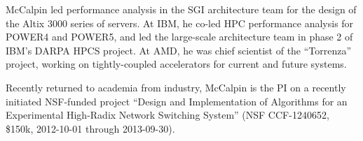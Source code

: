 McCalpin led performance analysis in the SGI architecture team for the design 
of the Altix 3000 series of servers.  At IBM, he co-led HPC performance analysis
for POWER4 and POWER5, and led the large-scale architecture team in phase 2
of IBM's DARPA HPCS project.  At AMD, he was chief scientist of the ``Torrenza''
project, working on tightly-coupled accelerators for current and future systems.


\begin{comment}
At SGI, McCalpin was the performance lead on the architecture of the SGI
Altix3000 series of scalable distributed shared memory servers.
At IBM, he co-led HPC performance analysis for the POWER4 systems, 
made major contributions to the POWER5 design, led POWER5 post-silicon
performance analysis, and led the large-scale architecture team in
phase 2 of IBM's DARPA HPCS project ("PERCS").  At AMD, he was the
chief scientist of the "Torrenza" project, enabling third parties to
develop tightly-coupled accelerators for AMD systems and researching
enhanced architectural support for future heterogeneous systems.
\end{comment}

Recently returned to academia from industry, McCalpin is the PI on
a recently initiated NSF-funded project ``Design and Implementation
of Algorithms for an Experimental High-Radix Network Switching System''
(NSF CCF-1240652, \$150k, 2012-10-01 through 2013-09-30).

